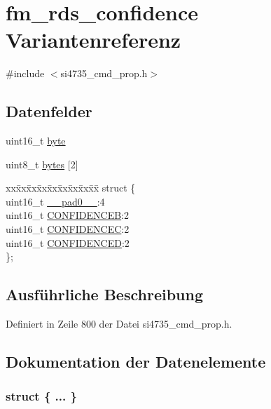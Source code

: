 \hypertarget{unionfm__rds__confidence}{}\section{fm\+\_\+rds\+\_\+confidence Variantenreferenz}
\label{unionfm__rds__confidence}


{\ttfamily \#include $<$si4735\+\_\+cmd\+\_\+prop.\+h$>$}

\subsection*{Datenfelder}
\begin{DoxyCompactItemize}
\item 
uint16\+\_\+t \hyperlink{unionfm__rds__confidence_ab0549c1b5ea980a02e7eab77e21fea49}{byte}
\item 
uint8\+\_\+t \hyperlink{unionfm__rds__confidence_a46e4c05d20a047ec169f60d3167e912e}{bytes} \mbox{[}2\mbox{]}
\item 
\begin{tabbing}
xx\=xx\=xx\=xx\=xx\=xx\=xx\=xx\=xx\=\kill
struct \{\\
\>uint16\_t \hyperlink{unionfm__rds__confidence_a77132c2c26a75f5b8751b235cda23828}{\_\_pad0\_\_}:4\\
\>uint16\_t \hyperlink{unionfm__rds__confidence_ad50cf40b7308de47174d7172846def72}{CONFIDENCEB}:2\\
\>uint16\_t \hyperlink{unionfm__rds__confidence_ab0a4bcb0b2e578ddbbbc4e33767a7df2}{CONFIDENCEC}:2\\
\>uint16\_t \hyperlink{unionfm__rds__confidence_af81bc38f41af0228eb6a646489ad2e3a}{CONFIDENCED}:2\\
\}; \\

\end{tabbing}\end{DoxyCompactItemize}


\subsection{Ausführliche Beschreibung}


Definiert in Zeile 800 der Datei si4735\+\_\+cmd\+\_\+prop.\+h.



\subsection{Dokumentation der Datenelemente}
\hypertarget{unionfm__rds__confidence_a1f443c15fe7b2afe0c923ab9b89b7577}{}\subsubsection[{"@97}]{\setlength{\rightskip}{0pt plus 5cm}struct \{ ... \} }\label{unionfm__rds__confidence_a1f443c15fe7b2afe0c923ab9b89b7577}
\hypertarget{unionfm__rds__confidence_a77132c2c26a75f5b8751b235cda23828}{}
